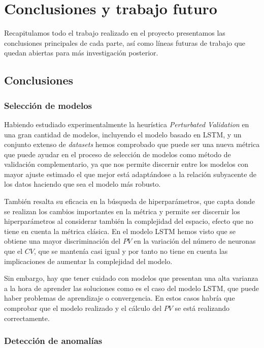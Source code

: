 
\chapter{Conclusiones y trabajo futuro}\label{ch:conclusiones-trabajo}

Recapitulamos todo el trabajo realizado en el proyecto presentamos las conclusiones principales de cada parte, así como líneas futuras de trabajo que quedan abiertas para más investigación posterior.

\section{Conclusiones}

\subsection{Selección de modelos}

Habiendo estudiado experimentalmente la heurística \emph{Perturbated Validation} en una gran cantidad de modelos, incluyendo el modelo basado en LSTM, y un conjunto extenso de \emph{datasets} hemos comprobado que puede ser una nueva métrica que puede ayudar en el proceso de selección de modelos como método de validación complementario, ya que nos permite discernir entre los modelos con mayor ajuste estimado el que mejor está adaptándose a la relación subyacente de los datos haciendo que sea el modelo más robusto.

También resalta su eficacia en la búsqueda de hiperparámetros, que capta donde se realizan los cambios importantes en la métrica y permite ser discernir los hiperparámetros al considerar también la complejidad del espacio, efecto que no tiene en cuenta la métrica clásica. En el modelo LSTM hemos visto que se obtiene una mayor discriminación del $PV$ en la variación del número de neuronas que el $CV$, que se mantenía casi igual y por tanto no tiene en cuenta las implicaciones de aumentar la complejidad del modelo.

Sin embargo, hay que tener cuidado con modelos que presentan una alta varianza a la hora de aprender las soluciones como es el caso del modelo LSTM, que puede haber problemas de aprendizaje o convergencia. En estos casos habría que comprobar que el modelo realizado y el cálculo del $PV$ se está realizando correctamente.

\subsection{Detección de anomalías}


